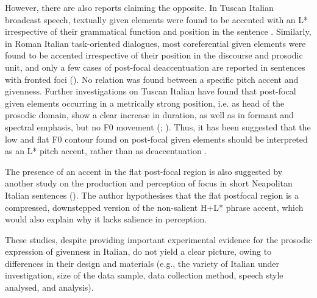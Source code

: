 However, there are also reports claiming the opposite. In Tuscan Italian broadcast speech, textually given elements were found to be accented with an L* irrespective of their grammatical function and position in the sentence \citep{Avesani1997}. Similarly, in Roman Italian task-oriented dialogues, most coreferential given elements were found to be accented irrespective of their position in the discourse and prosodic unit, and only a few cases of post-focal deaccentuation are reported in sentences with fronted foci (\citealt{AvesaniVayra2005}). No relation was found between a specific pitch accent and givenness. Further investigations on Tuscan Italian have found that post-focal given elements occurring in a metrically strong position, i.e. as head of the prosodic domain, show a clear increase in duration, as well as in formant and spectral emphasis, but no F0 movement (\citealt{Bocci2013}; \citealt{BocciAvesani2011,BocciAvesani2015}). Thus, it has been suggested that the low and flat F0 contour found on post-focal given elements should be interpreted as an L* pitch accent, rather than as deaccentuation \citep{Bocci2013}.

The presence of an accent in the flat post-focal region is also suggested by another study on the production and perception of focus in short Neapolitan Italian sentences (\citealt{DImperio2002}). The author hypothesises that the flat postfocal region is a compressed, downstepped version of the non-salient H+L* phrase accent, which would also explain why it lacks salience in perception.

These studies, despite providing important experimental evidence for the prosodic expression of givenness in Italian, do not yield a clear picture, owing to differences in their design and materials (e.g., the variety of Italian under investigation, size of the data sample, data collection method, speech style analysed, and analysis). 

